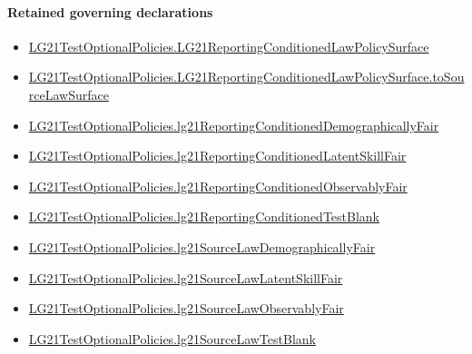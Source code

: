 \documentclass[10pt]{article}
\begin{document}
\paragraph{Retained governing declarations}
\begin{itemize}\raggedright
\item \hyperlink{governing-declaration-5be59016006a7465}{LG21\allowbreak{}Test\allowbreak{}Optional\allowbreak{}Policies.\allowbreak{}LG21\allowbreak{}Reporting\allowbreak{}Conditioned\allowbreak{}Law\allowbreak{}Policy\allowbreak{}Surface}
\item \hyperlink{governing-declaration-3e0808f35f7df0a9}{LG21\allowbreak{}Test\allowbreak{}Optional\allowbreak{}Policies.\allowbreak{}LG21\allowbreak{}Reporting\allowbreak{}Conditioned\allowbreak{}Law\allowbreak{}Policy\allowbreak{}Surface.\allowbreak{}to\allowbreak{}Source\allowbreak{}Law\allowbreak{}Surface}
\item \hyperlink{governing-declaration-02c2413f711004bc}{LG21\allowbreak{}Test\allowbreak{}Optional\allowbreak{}Policies.\allowbreak{}lg21\allowbreak{}Reporting\allowbreak{}Conditioned\allowbreak{}Demographically\allowbreak{}Fair}
\item \hyperlink{governing-declaration-ac3c46c17f168970}{LG21\allowbreak{}Test\allowbreak{}Optional\allowbreak{}Policies.\allowbreak{}lg21\allowbreak{}Reporting\allowbreak{}Conditioned\allowbreak{}Latent\allowbreak{}Skill\allowbreak{}Fair}
\item \hyperlink{governing-declaration-6c43bc012ef78f58}{LG21\allowbreak{}Test\allowbreak{}Optional\allowbreak{}Policies.\allowbreak{}lg21\allowbreak{}Reporting\allowbreak{}Conditioned\allowbreak{}Observably\allowbreak{}Fair}
\item \hyperlink{governing-declaration-9e35e0501a60b143}{LG21\allowbreak{}Test\allowbreak{}Optional\allowbreak{}Policies.\allowbreak{}lg21\allowbreak{}Reporting\allowbreak{}Conditioned\allowbreak{}Test\allowbreak{}Blank}
\item \hyperlink{paper-prerequisite-051c0554c55aebdb}{LG21\allowbreak{}Test\allowbreak{}Optional\allowbreak{}Policies.\allowbreak{}lg21\allowbreak{}Source\allowbreak{}Law\allowbreak{}Demographically\allowbreak{}Fair}
\item \hyperlink{paper-prerequisite-29470906bfc1caef}{LG21\allowbreak{}Test\allowbreak{}Optional\allowbreak{}Policies.\allowbreak{}lg21\allowbreak{}Source\allowbreak{}Law\allowbreak{}Latent\allowbreak{}Skill\allowbreak{}Fair}
\item \hyperlink{paper-prerequisite-a01f7afb43c09d7e}{LG21\allowbreak{}Test\allowbreak{}Optional\allowbreak{}Policies.\allowbreak{}lg21\allowbreak{}Source\allowbreak{}Law\allowbreak{}Observably\allowbreak{}Fair}
\item \hyperlink{paper-prerequisite-986d6a99819fc5ac}{LG21\allowbreak{}Test\allowbreak{}Optional\allowbreak{}Policies.\allowbreak{}lg21\allowbreak{}Source\allowbreak{}Law\allowbreak{}Test\allowbreak{}Blank}
\end{itemize}
\end{document}
